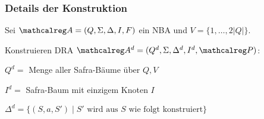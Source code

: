     \begin{frame}
      \frametitle{Details der Konstruktion}
      
      Sei $\Aut{A} = (Q,\Sigma,\Delta,I,F)$ ein NBA und $V=\{1,\dots,2|Q|\}$.
      \par\smallskip
      Konstruieren DRA $\Aut{A}^d = (Q^d,\Sigma,\Delta^d,I^d,\calP)$:
      \begin{Itemize}
        \item
          $Q^d = $ Menge aller Safra-Bäume über $Q,V$
        \item
          $I^d = $ Safra-Baum mit einzigem Knoten $I$
        \item
          $\Delta^d = \{(S,a,S') \mid S' \text{~wird aus $S$ wie folgt konstruiert}\}$
      \end{Itemize}

    \end{frame}

